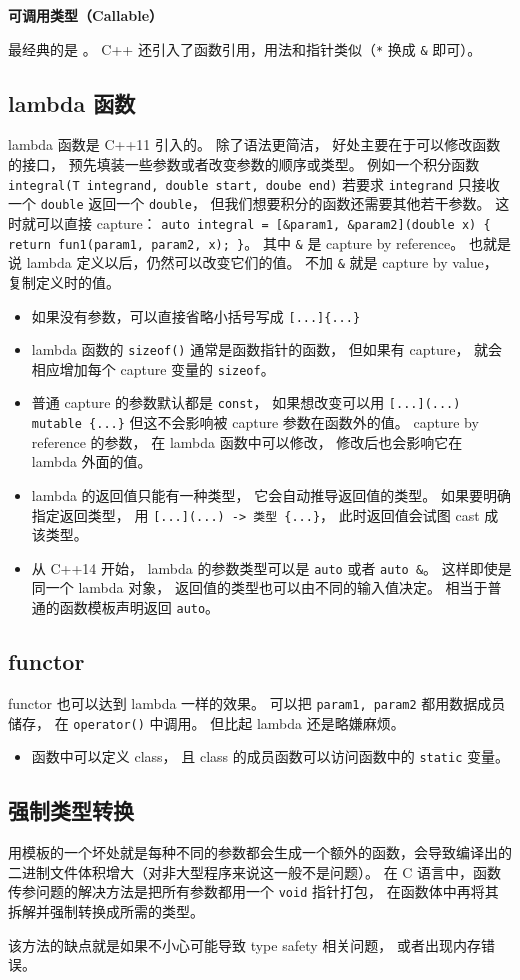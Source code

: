 

\textbf{可调用类型（Callable）}

最经典的是 。 C++ 还引入了函数引用，用法和指针类似（\verb`*` 换成 \verb`&` 即可）。

\subsection{lambda 函数}
lambda 函数是 C++11 引入的。 除了语法更简洁， 好处主要在于可以修改函数的接口， 预先填装一些参数或者改变参数的顺序或类型。 例如一个积分函数 \verb`integral(T integrand, double start, doube end)` 若要求 \verb`integrand` 只接收一个 \verb`double` 返回一个 \verb`double`， 但我们想要积分的函数还需要其他若干参数。 这时就可以直接 capture： \verb`auto integral = [&param1, &param2](double x) { return fun1(param1, param2, x); }`。 其中 \verb`&` 是 capture by reference。 也就是说 lambda 定义以后，仍然可以改变它们的值。 不加 \verb`&` 就是 capture by value， 复制定义时的值。

\begin{itemize}
\item 如果没有参数，可以直接省略小括号写成 \verb`[...]{...}`
\item lambda 函数的 \verb`sizeof()` 通常是函数指针的函数， 但如果有 capture， 就会相应增加每个 capture 变量的 \verb`sizeof`。
\item 普通 capture 的参数默认都是 \verb`const`， 如果想改变可以用 \verb`[...](...) mutable {...}` 但这不会影响被 capture 参数在函数外的值。 capture by reference 的参数， 在 lambda 函数中可以修改， 修改后也会影响它在 lambda 外面的值。
\item lambda 的返回值只能有一种类型， 它会自动推导返回值的类型。 如果要明确指定返回类型， 用 \verb`[...](...) -> 类型 {...}`， 此时返回值会试图 cast 成该类型。
\item 从 C++14 开始， lambda 的参数类型可以是 \verb`auto` 或者 \verb`auto &`。 这样即使是同一个 lambda 对象， 返回值的类型也可以由不同的输入值决定。 相当于普通的函数模板声明返回 \verb`auto`。
\end{itemize}

\subsection{functor}
functor 也可以达到 lambda 一样的效果。 可以把 \verb`param1, param2` 都用数据成员储存， 在 \verb`operator()` 中调用。 但比起 lambda 还是略嫌麻烦。

\begin{itemize}
\item 函数中可以定义 class， 且 class 的成员函数可以访问函数中的 \verb`static` 变量。
\end{itemize}

\subsection{强制类型转换}
用模板的一个坏处就是每种不同的参数都会生成一个额外的函数，会导致编译出的二进制文件体积增大（对非大型程序来说这一般不是问题）。 在 C 语言中，函数传参问题的解决方法是把所有参数都用一个 \verb`void` 指针打包， 在函数体中再将其拆解并强制转换成所需的类型。

该方法的缺点就是如果不小心可能导致 type safety 相关问题， 或者出现内存错误。
